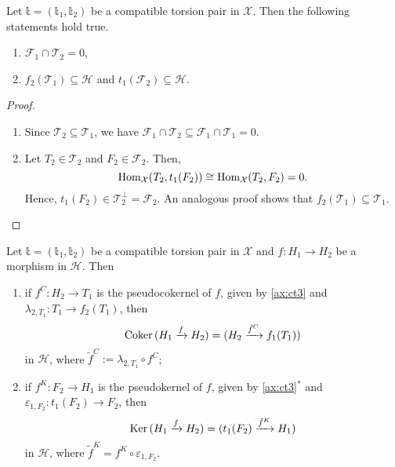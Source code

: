 \begin{lemma}\label{lem:1.2}
  Let $\mathbb{t}=(\mathbb{t}_1,\mathbb{t}_2)$ be a compatible torsion pair in $\mathcal{X}$.
  Then the following statements hold true.
  \begin{enumerate}[label=(\alph*)]
    \item $\mathcal{F}_1\cap\mathcal{T}_2=0$,
    \item $f_2(\mathcal{T}_1)\subseteq\mathcal{H}$ and $t_1(\mathcal{F}_2)\subseteq\mathcal{H}$.
  \end{enumerate}
\end{lemma}

\begin{proof}
  \begin{enumerate}[label=(\alph*)]
    \item Since $\mathcal{T}_2\subseteq\mathcal{T}_1$, we have $\mathcal{F}_1\cap\mathcal{T}_2\subseteq \mathcal{F}_1\cap\mathcal{T}_1=0$.
    \item Let $T_2\in\mathcal{T}_2$ and $F_2\in\mathcal{F}_2$. Then,
    \begin{equation*}
      \mathrm{Hom}_{\mathcal{X}}(T_2,t_1(F_2))\cong \mathrm{Hom}_{\mathcal{X}}(T_2,F_2)=0.
    \end{equation*}
    Hence, $t_1(F_2)\in\mathcal{T}_2^\perp = \mathcal{F}_2$. An analogous proof shows that $f_2(\mathcal{T}_1)\subseteq\mathcal{T}_1$.
  \end{enumerate}
\end{proof}

\begin{prop}\label{prop:1.3}
  Let $\mathbb{t}=(\mathbb{t}_1,\mathbb{t}_2)$ be a compatible torsion pair in $\mathcal{X}$ and
  $f:H_1\to H_2$ be a morphism in $\mathcal{H}$. Then
  \begin{enumerate}[label=(\alph*)]
    \item\label{prop:1.3:a} if $f^C:H_2\to T_1$ is the pseudocokernel of $f$, given by \ref{ax:ct3}
    and $\lambda_{2,T_1}:T_1\to f_2(T_1)$, then
    \begin{equation*}
      \mathrm{\textup{Coker\,}}(H_1\xrightarrow{f}H_2) = (H_2\xrightarrow{\tilde{f}^C}f_1(T_1))
    \end{equation*}
    in $\mathcal{H}$, where $\tilde{f}^C:=\lambda_{2,T_1}\circ f^C$;
    \item\label{prop:1.3:b} if $f^K:F_2\to H_1$ is the pseudokernel of $f$, given by \ref{ax:ct3}$^\ast$
    and $\varepsilon_{1,F_2}:t_1(F_2)\to F_2$, then
    \begin{equation*}
      \mathrm{\textup{Ker\,}}(H_1\xrightarrow{f} H_2) = (t_1(F_2)\xrightarrow{\tilde{f}^K}H_1)
    \end{equation*}
    in $\mathcal{H}$, where $\tilde{f}^K=f^K\circ \varepsilon_{1,F_2}$.
  \end{enumerate}
\end{prop}

